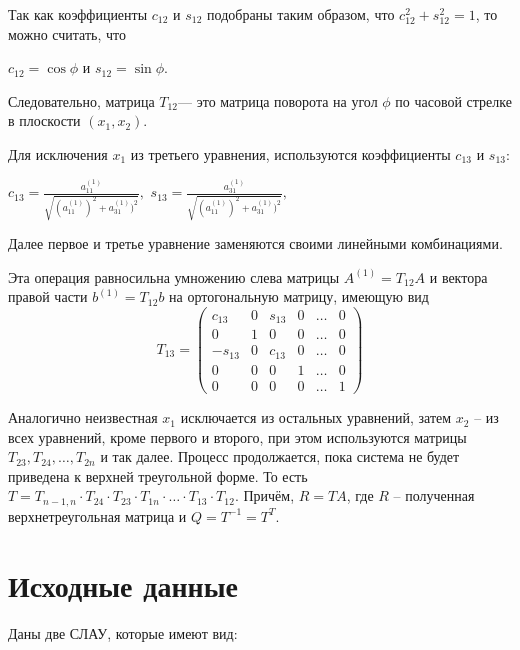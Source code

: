\documentclass[12pt, a4paper]{article}
\begin{document}
Так как коэффициенты $c_{12}$ и $s_{12}$ подобраны таким образом, что $c_{12}^{2} + s_{12}^{2}=1$, то можно считать, что 
\begin{center}
$c_{12}=\cos{\phi}$ и $s_{12}=\sin{\phi}.$ 
\end{center}	

Следовательно, матрица $T_{12}$--- это матрица поворота на угол $\phi$ по часовой стрелке в плоскости $(x_1,x_2)$. 

\pagebreak

Для исключения $x_1$ из третьего уравнения, используются коэффициенты $c_{13}$ и $s_{13}$:
\begin{center}
    $c_{13}=\frac{a_{11}^{(1)}}{\sqrt{(a_{11}^{(1)})^2+a_{31}^{(1)})^2}},$
    $s_{13}=\frac{a_{31}^{(1)}}{\sqrt{(a_{11}^{(1)})^2+a_{31}^{(1)})^2}},$
\end{center}
    
Далее первое и третье уравнение заменяются своими линейными комбинациями. 

Эта операция равносильна умножению слева матрицы $A^{(1)}=T_{12}A$ и вектора правой части $b^{(1)}=T_{12}b$ на ортогональную матрицу, имеющую вид 
\[
T_{13}=
\begin{pmatrix}
c_{13} & 0 & s_{13} & 0 & \ldots & 0 \\
0 & 1 & 0 & 0 & \ldots & 0 \\
-s_{13} & 0 & c_{13} & 0 & \ldots & 0 \\
0 & 0 & 0 & 1 & \ldots & 0 \\
0 & 0 & 0 & 0 & \ldots & 1
\end{pmatrix}
\]

Аналогично неизвестная $x_{1}$ исключается из остальных уравнений, затем \linebreak $x_{2}$ -- из всех уравнений, кроме первого и второго, при этом используются матрицы $T_{23},T_{24}, \ldots, T_{2n}$ и так далее. Процесс продолжается, пока система не будет приведена к верхней треугольной форме. То есть $ T = T_{n - 1, n} \cdot T_{24} \cdot T_{23} \cdot T_{1n} \cdot \ldots \cdot T_{13} \cdot T_{12}. $ Причём, $R=TA$, где $R$ -- полученная верхнетреугольная матрица и $Q=T^{-1}=T^{T}.$

\newpage

\section{Исходные данные}
Даны две СЛАУ, которые имеют вид: 
\end{document}
